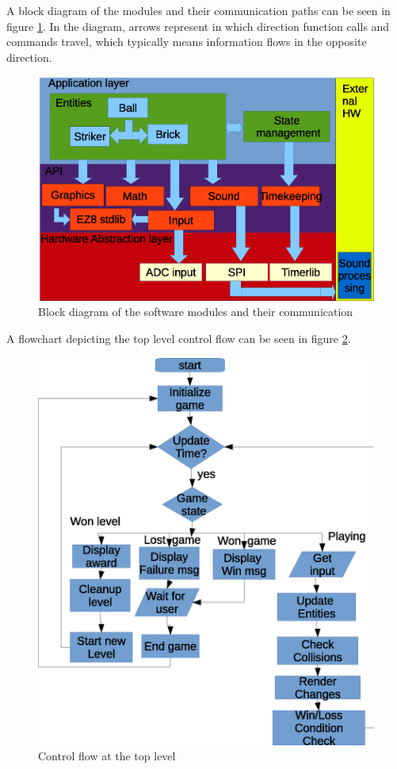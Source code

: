 A block diagram of the modules and their communication paths can be seen in figure \ref{architecture_block}. In the
diagram, arrows represent in which direction function calls and commands travel, which typically means information
flows in the opposite direction. \\

\begin{figure}
	\center
	\includegraphics[scale=0.7]{pictures/architecture_block.eps}
	\caption{Block diagram of the software modules and their communication}
	\label{architecture_block}
\end{figure}

A flowchart depicting the top level control flow can be seen in figure \ref{top_flow}.

\begin{figure}
	\center
	\includegraphics[scale=0.7]{pictures/top_flow.eps}
	\caption{Control flow at the top level}
	\label{top_flow}
\end{figure}
